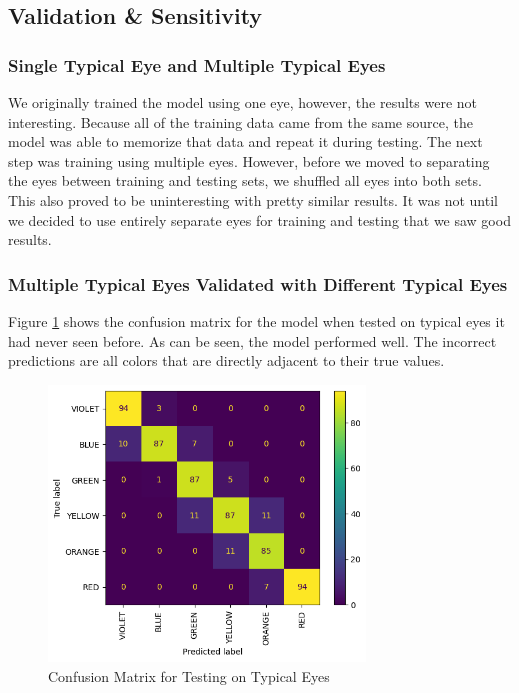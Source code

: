 \documentclass[titlepage]{article}
\begin{document}
\subsection{Validation \& Sensitivity}

\subsubsection{Single Typical Eye and Multiple Typical Eyes}

We originally trained the model using one eye, however, the results were not interesting. Because all of the training data came from the same source, the model was able to memorize that data and repeat it during testing. The next step was training using multiple eyes. However, before we moved to separating the eyes between training and testing sets, we shuffled all eyes into both sets. This also proved to be uninteresting with pretty similar results. It was not until we decided to use entirely separate eyes for training and testing that we saw good results.

\subsubsection{Multiple Typical Eyes Validated with Different Typical Eyes}

Figure \ref{fig:typical_confusion_matrix} shows the confusion matrix for the model when tested on typical eyes it had never seen before. As can be seen, the model performed well. The incorrect predictions are all colors that are directly adjacent to their true values.

\begin{figure}[H]
    \centering
    \includegraphics[width=0.75\textwidth]{figs/typical_confusion_matrix.png}
    \caption{Confusion Matrix for Testing on Typical Eyes}
    \label{fig:typical_confusion_matrix}
\end{figure}
\end{document}
